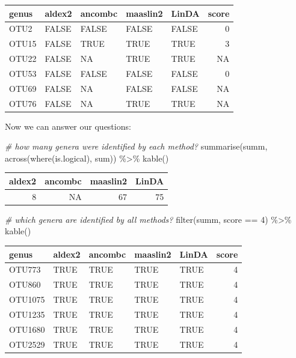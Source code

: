 \documentclass[
]{book}
\newenvironment{Shaded}{\begin{snugshade}}{\end{snugshade}}
\newcommand{\CommentTok}[1]{\textcolor[rgb]{0.56,0.35,0.01}{\textit{#1}}}
\newcommand{\DecValTok}[1]{\textcolor[rgb]{0.00,0.00,0.81}{#1}}
\newcommand{\FunctionTok}[1]{\textcolor[rgb]{0.00,0.00,0.00}{#1}}
\newcommand{\NormalTok}[1]{#1}
\newcommand{\SpecialCharTok}[1]{\textcolor[rgb]{0.00,0.00,0.00}{#1}}
\begin{document}
\begin{tabular}{l|l|l|l|l|r}
\hline
genus & aldex2 & ancombc & maaslin2 & LinDA & score\\
\hline
OTU2 & FALSE & FALSE & FALSE & FALSE & 0\\
\hline
OTU15 & FALSE & TRUE & TRUE & TRUE & 3\\
\hline
OTU22 & FALSE & NA & TRUE & TRUE & NA\\
\hline
OTU53 & FALSE & FALSE & FALSE & FALSE & 0\\
\hline
OTU69 & FALSE & NA & FALSE & FALSE & NA\\
\hline
OTU76 & FALSE & NA & TRUE & TRUE & NA\\
\hline
\end{tabular}

Now we can answer our questions:

\begin{Shaded}
\begin{Highlighting}[]
\CommentTok{\# how many genera were identified by each method?}
\FunctionTok{summarise}\NormalTok{(summ, }\FunctionTok{across}\NormalTok{(}\FunctionTok{where}\NormalTok{(is.logical), sum)) }\SpecialCharTok{\%\textgreater{}\%}
  \FunctionTok{kable}\NormalTok{()}
\end{Highlighting}
\end{Shaded}

\begin{tabular}{r|r|r|r}
\hline
aldex2 & ancombc & maaslin2 & LinDA\\
\hline
8 & NA & 67 & 75\\
\hline
\end{tabular}

\begin{Shaded}
\begin{Highlighting}[]
\CommentTok{\# which genera are identified by all methods?}
\FunctionTok{filter}\NormalTok{(summ, score }\SpecialCharTok{==} \DecValTok{4}\NormalTok{) }\SpecialCharTok{\%\textgreater{}\%} \FunctionTok{kable}\NormalTok{()}
\end{Highlighting}
\end{Shaded}

\begin{tabular}{l|l|l|l|l|r}
\hline
genus & aldex2 & ancombc & maaslin2 & LinDA & score\\
\hline
OTU773 & TRUE & TRUE & TRUE & TRUE & 4\\
\hline
OTU860 & TRUE & TRUE & TRUE & TRUE & 4\\
\hline
OTU1075 & TRUE & TRUE & TRUE & TRUE & 4\\
\hline
OTU1235 & TRUE & TRUE & TRUE & TRUE & 4\\
\hline
OTU1680 & TRUE & TRUE & TRUE & TRUE & 4\\
\hline
OTU2529 & TRUE & TRUE & TRUE & TRUE & 4\\
\hline
\end{tabular}
\end{document}
